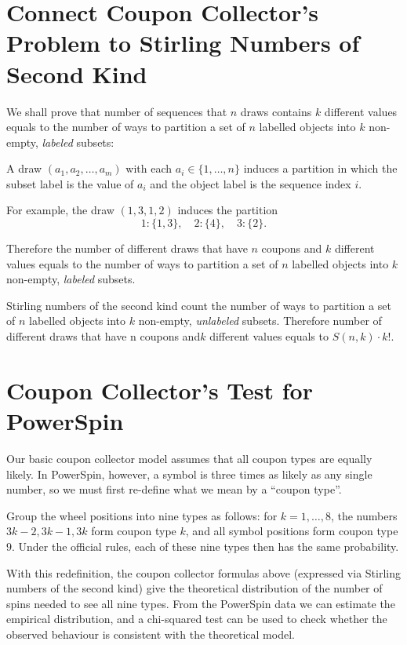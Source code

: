 \section{Connect Coupon Collector's Problem to Stirling Numbers of Second Kind}
We shall prove that number of sequences that \(n\) draws contains \(k\) different values 
equals to 
the number of ways to partition a set of
\(n\) labelled objects into \(k\) non-empty, \emph{labeled} subsets:

A draw $(a_1, a_2, \dots, a_m)$ with each $a_i \in \{1,\dots,n\}$ induces a partition in which
the subset label is the value of $a_i$ and the object label is the sequence index $i$.

For example, the draw $(1,3,1,2)$ induces the partition
\[
  1:\{1,3\},\quad 2:\{4\},\quad 3:\{2\}.
\]

Therefore the number of different draws that have \(n\) coupons and \(k\) different values equals to 
the number of ways to partition a set of
\(n\) labelled objects into \(k\) non-empty, \emph{labeled} subsets.

Stirling numbers of the second kind count the number of ways to partition a set of
\(n\) labelled objects into \(k\) non-empty, \emph{unlabeled} subsets. 
Therefore number of different draws that have n coupons and\(k\) different values equals to 
\(S(n,k) \cdot k!\).

\section{Coupon Collector's Test for PowerSpin}
Our basic coupon collector model assumes that all coupon types are equally
likely.  In PowerSpin, however, a symbol is three times as likely as any single
number, so we must first re-define what we mean by a ``coupon type''.

Group the wheel positions into nine types as follows: for \(k=1,\dots,8\), the
numbers \(3k-2,3k-1,3k\) form coupon type \(k\), and all symbol positions form
coupon type \(9\).  Under the official rules, each of these nine types then has
the same probability.

With this redefinition, the coupon collector formulas above (expressed via
Stirling numbers of the second kind) give the theoretical distribution of the
number of spins needed to see all nine types.  From the PowerSpin data we can
estimate the empirical distribution, and a chi-squared test can be used to
check whether the observed behaviour is consistent with the theoretical model.

